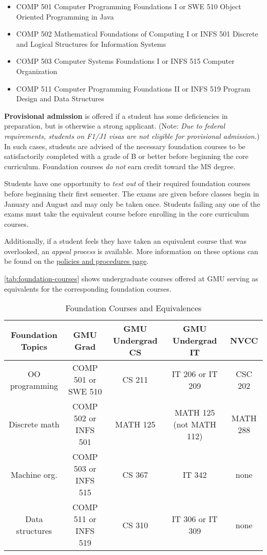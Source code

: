\documentclass[oneside,11pt]{memoir}
\begin{document}
\begin{itemize}
\item COMP 501 Computer Programming Foundations I or SWE 510 Object Oriented Programming in Java
\item COMP 502 Mathematical Foundations of Computing I or INFS 501 Discrete and Logical Structures for Information Systems
\item COMP 503 Computer Systems Foundations I or INFS 515 Computer Organization
\item COMP 511 Computer Programming Foundations II or INFS 519 Program Design and Data Structures
\end{itemize}

\textbf{Provisional admission} is offered if a student has some deficiencies in preparation, but is otherwise a strong applicant. (Note: \emph{Due to federal requirements, students on F1/J1 visas are not eligible for provisional admission.}) In such cases, students are advised of the necessary foundation courses to be satisfactorily completed with a grade of B or better before beginning the core curriculum. Foundation courses \emph{do not} earn credit toward the MS degree. 

Students have one opportunity to \emph{test out} of their required foundation courses before beginning their first semester. 
The exams are given before classes begin in January and August and may only be taken once. Students failing any one of the exams must take the equivalent course before enrolling in the core curriculum courses.

Additionally, if a student feels they have taken an equivalent course that was overlooked, an \emph{appeal process} is available. More information on these options can be found on the \href{https://cs.gmu.edu/current-students/ms-students/foundation-courses/policies-and-procedures/}{policies and procedures page}.

\autoref{tab:foundation-courses} shows undergraduate courses offered at GMU serving as equivalents for the corresponding foundation courses.

\begin{table}[]
    \centering
    \footnotesize
    \begin{tabular}{c|c|c|c|c}
      Foundation Topics   & GMU Grad  &	GMU Undergrad CS &	GMU Undergrad IT &	NVCC\\
      \midrule
      OO programming & 	COMP 501 or SWE 510 & 	CS 211 & 	IT 206 or IT 209 &	CSC 202\\
      Discrete math              &	COMP 502 or INFS 501 & 	MATH 125 & 	MATH 125 (not MATH 112) & 	MATH 288\\
      Machine org. 	& COMP 503 or INFS 515 &	CS 367 	&IT 342 	& none\\
      Data structures &	COMP 511 or INFS 519 &	CS 310 	& IT 306 or IT 309 &	none\\
    \end{tabular}
    \caption{Foundation Courses and Equivalences}
    \label{tab:foundation-courses}
\end{table}
\end{document}
